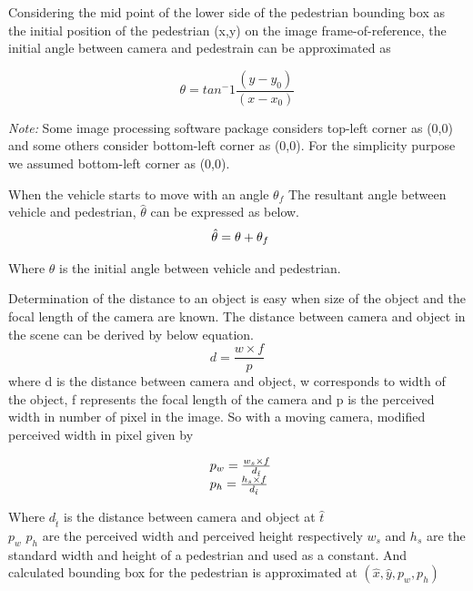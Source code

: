Considering the mid point of the lower side of the pedestrian bounding box as the initial position of the pedestrian (x,y) on the image frame-of-reference, the initial angle between camera and pedestrain can be approximated as

\begin{equation}
{\theta }= tan^-1\frac{(y-y_0)}{(x-x_0)}
\end{equation}

\textit{Note:} Some image processing software package considers top-left corner as (0,0) and some others consider bottom-left corner as (0,0). For the simplicity purpose we assumed  bottom-left corner as (0,0).

When the vehicle starts to move with an angle ${\theta }_f$ 
The resultant angle between vehicle and pedestrian, $\hat{\theta}$ can be expressed as below.
\begin{equation}
\begin{array}{l@{}}
\hat{\theta } = \theta  + {\theta }_f\\
\end{array}			
\end{equation}

Where ${\theta }$ is the initial angle between vehicle and pedestrian.

Determination of the distance to an object \cite{jungel2007improving} is easy when size of the object and the focal length of the camera are known.
The distance between camera and object in the scene can be derived by below equation.
\begin{equation}
d = \frac{w \times f}{p}
\end{equation}
where d is the distance between camera and object, w corresponds to width of the object, f represents the focal length of the camera and p is the perceived width in number of pixel in the image.
So with a moving camera, modified perceived width in pixel given by

\begin{equation}
\begin{array}{l@{}}
{p_w} = \frac{w_s \times f}{d_{\hat{t}}} \\
{p_h} = \frac{h_s \times f}{d_{\hat{t}}}
\end{array}			
\end{equation}

Where $d_{\hat{t}}$ is the distance between camera and object at $\hat{t}$ \\
${p_w}$ ${p_h}$ are the perceived width and perceived height respectively
$w_s$ and $h_s$ are the standard width and height of a pedestrian and used as a constant.
And calculated bounding box for the pedestrian is approximated at $(\hat{x}, \hat{y},{p_w}, {p_h})$

